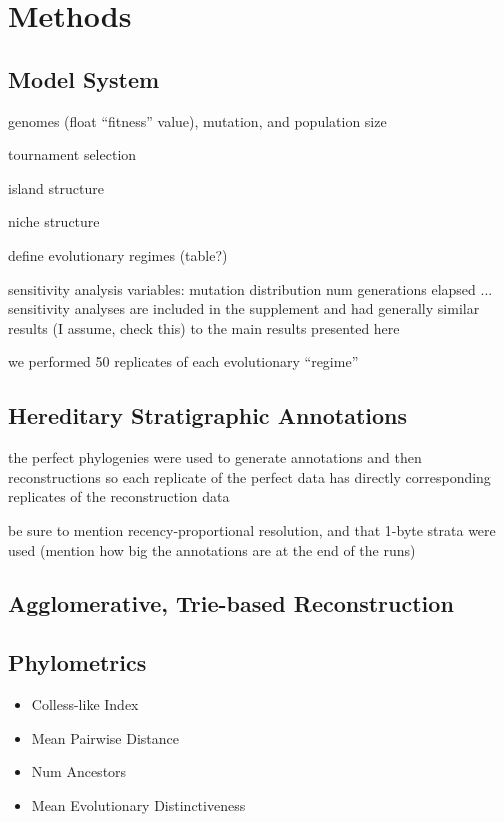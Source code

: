 \section{Methods} \label{sec:methods}

\subsection{Model System}

genomes (float ``fitness'' value), mutation, and population size

tournament selection

island structure

niche structure

define evolutionary regimes (table?)

sensitivity analysis variables:
mutation distribution
num generations elapsed
... sensitivity analyses are included in the supplement and had generally similar results (I assume, check this) to the main results presented here

we performed 50 replicates of each evolutionary ``regime''

\subsection{Hereditary Stratigraphic Annotations}

the perfect phylogenies were used to generate annotations and then reconstructions so each replicate of the perfect data has directly corresponding replicates of the reconstruction data

be sure to mention recency-proportional resolution, and that 1-byte strata were used (mention how big the annotations are at the end of the runs)

\subsection{Agglomerative, Trie-based Reconstruction}

\subsection{Phylometrics}
\begin{itemize}
    \item Colless-like Index \citep{mirSoundCollesslikeBalance2018}
    \item Mean Pairwise Distance
    \item Num Ancestors
    \item Mean Evolutionary Distinctiveness \citep{isaacMammalsEDGEConservation2007}
\end{itemize}

